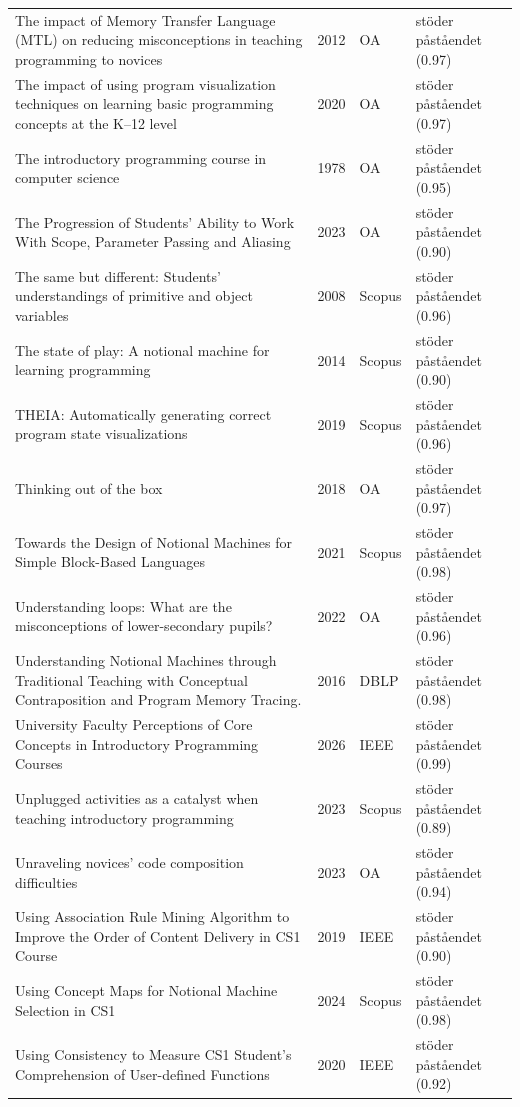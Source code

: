 \begin{longtable}{@{}%
  >{\raggedright\arraybackslash}p{}c%
  >{\raggedright\arraybackslash}p{}%
  >{\raggedright\arraybackslash}p{}@{}}
The impact of Memory Transfer Language (MTL) on reducing misconceptions in teaching programming to novices & 2012 & OA & stöder påståendet (0.97) \\
The impact of using program visualization techniques on learning basic programming concepts at the K--12 level & 2020 & OA & stöder påståendet (0.97) \\
The introductory programming course in computer science & 1978 & OA & stöder påståendet (0.95) \\
The Progression of Students' Ability to Work With Scope, Parameter Passing and Aliasing & 2023 & OA & stöder påståendet (0.90) \\
The same but different: Students' understandings of primitive and object variables & 2008 & Scopus & stöder påståendet (0.96) \\
The state of play: A notional machine for learning programming & 2014 & Scopus & stöder påståendet (0.90) \\
THEIA: Automatically generating correct program state visualizations & 2019 & Scopus & stöder påståendet (0.96) \\
Thinking out of the box & 2018 & OA & stöder påståendet (0.97) \\
Towards the Design of Notional Machines for Simple Block-Based Languages & 2021 & Scopus & stöder påståendet (0.98) \\
Understanding loops: What are the misconceptions of lower-secondary pupils? & 2022 & OA & stöder påståendet (0.96) \\
Understanding Notional Machines through Traditional Teaching with Conceptual Contraposition and Program Memory Tracing. & 2016 & DBLP & stöder påståendet (0.98) \\
University Faculty Perceptions of Core Concepts in Introductory Programming Courses & 2026 & IEEE & stöder påståendet (0.99) \\
Unplugged activities as a catalyst when teaching introductory programming & 2023 & Scopus & stöder påståendet (0.89) \\
Unraveling novices' code composition difficulties & 2023 & OA & stöder påståendet (0.94) \\
Using Association Rule Mining Algorithm to Improve the Order of Content Delivery in CS1 Course & 2019 & IEEE & stöder påståendet (0.90) \\
Using Concept Maps for Notional Machine Selection in CS1 & 2024 & Scopus & stöder påståendet (0.98) \\
Using Consistency to Measure CS1 Student's Comprehension of User-defined Functions & 2020 & IEEE & stöder påståendet (0.92) \\

\end{longtable}
